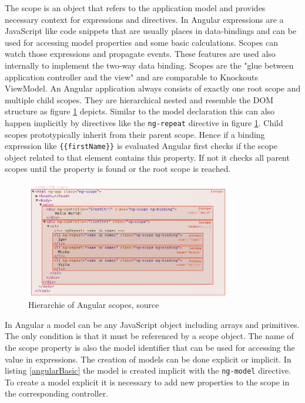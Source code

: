 The scope is an object that refers to the application model and provides necessary context for expressions and directives.
In Angular expressions are a JavaScript like code snippets that are usually places in data-bindings and can be used for accessing model properties and some basic calculations.
Scopes can watch those expressions and propagate events.
These features are used also internally to implement the two-way data binding.
Scopes are the "glue between application controller and the view" \autocite{tech-ana:ng-scope} and are comparable to Knockouts ViewModel.
An Angular application always consists of exactly one root scope and multiple child scopes.
They are hierarchical nested and resemble the DOM structure as figure \ref{fig:angular_scopes} depicts.
Similar to the model declaration this can also happen implicitly by directives like the \texttt{ng-repeat} directive in figure \ref{fig:angular_scopes}.
Child scopes prototypically inherit from their parent scope.
Hence if a binding expression like \texttt{\{\{firstName\}\}} is evaluated Angular first checks if the scope object related to that element contains this property.
If not it checks all parent scopes until the property is found or the root scope is reached.

\begin{figure}
	\centering	
	\includegraphics[width=0.8\textwidth]{./img/tech-ana/angular_scopes.png}
	\caption{Hierarchie of Angular scopes, source \autocite{tech-ana:ng-scope}}
	\label{fig:angular_scopes}
\end{figure} 

In Angular a model can be any JavaScript object including arrays and primitives.
The only condition is that it must be referenced by a scope object.
The name of the scope property is also the model identifier that can be used for accessing the value in expressions.
The creation of models can be done explicit or implicit.
In listing \ref{angularBasic} the model is created implicit with the \texttt{ng-model} directive.
To create a model explicit it is necessary to add new properties to the scope in the corresponding controller.

